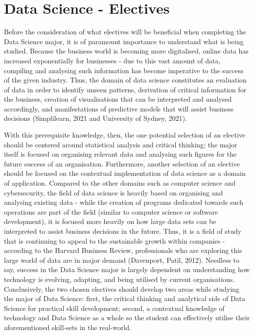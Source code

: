 \section{\textbf{Data Science - Electives}}

Before the consideration of what electives will be beneficial when completing the Data Science major, it is of paramount importance to understand what is being studied. Because the business world is becoming more digitalised, online data has increased exponentially for businesses - due to this vast amount of data, compiling and analysing such information has become imperative to the success of the given industry. Thus, the domain of data science constitutes an evaluation of data in order to identify unseen patterns, derivation of critical information for the business, creation of visualisations that can be interpreted and analysed accordingly, and manifestations of predictive models that will assist business decisions (Simplilearn, 2021 and University of Sydney, 2021). 


With this prerequisite knowledge, then, the one potential selection of an elective should be centered around statistical analysis and critical thinking; the major itself is focused on organising relevant data and analysing such figures for the future success of an organisation. Furthermore, another selection of an elective should be focused on the contextual implementation of data science as a domain of application. Compared to the other domains such as computer science and cybersecurity, the field of data science is heavily based on organising and analysing existing data - while the creation of programs dedicated towards such operations are part of the field (similar to computer science or software development), it is focused more heavily on how large data sets can be interpreted to assist business decisions in the future. Thus, it is a field of study that is continuing to appeal to the sustainable growth within companies - according to the Harvard Business Review, professionals who are exploring this large world of data are in major demand (Davenport, Patil, 2012). Needless to say, success in the Data Science major is largely dependent on understanding how technology is evolving, adapting, and being utilised by current organisations. Conclusively, the two chosen electives should develop two areas while studying the major of Data Science: first, the critical thinking and analytical side of Data Science for practical skill development; second, a contextual knowledge of technology and Data Science as a whole so the student can effectively utilise their aforementioned skill-sets in the real-world.


